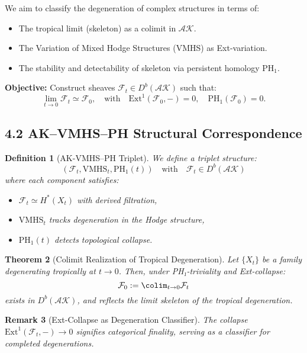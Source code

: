 \documentclass[11pt]{article}
\newtheorem{theorem}{Theorem}[section]
\newtheorem{definition}[theorem]{Definition}
\newtheorem{remark}[theorem]{Remark}
\begin{document}
We aim to classify the degeneration of complex structures in terms of:

\begin{itemize}
    \item The tropical limit (skeleton) as a colimit in \( \mathcal{AK} \).
    \item The Variation of Mixed Hodge Structures (VMHS) as Ext-variation.
    \item The stability and detectability of skeleton via persistent homology \( \mathrm{PH}_1 \).
\end{itemize}

\textbf{Objective:} Construct sheaves \( \mathcal{F}_t \in D^b(\mathcal{AK}) \) such that:
\[
\lim_{t \to 0} \mathcal{F}_t \simeq \mathcal{F}_0, \quad \text{with} \quad \mathrm{Ext}^1(\mathcal{F}_0, -) = 0, \quad \mathrm{PH}_1(\mathcal{F}_0) = 0.
\]

\subsection{4.2 AK--VMHS--PH Structural Correspondence}

\begin{definition}[AK-VMHS--PH Triplet]
We define a triplet structure:
\[
(\mathcal{F}_t, \mathrm{VMHS}_t, \mathrm{PH}_1(t)) \quad \text{with} \quad \mathcal{F}_t \in D^b(\mathcal{AK})
\]
where each component satisfies:
\begin{itemize}
    \item \( \mathcal{F}_t \simeq H^*(X_t) \) with derived filtration,
    \item \( \mathrm{VMHS}_t \) tracks degeneration in the Hodge structure,
    \item \( \mathrm{PH}_1(t) \) detects topological collapse.
\end{itemize}
\end{definition}

\begin{theorem}[Colimit Realization of Tropical Degeneration]
Let \( \{X_t\} \) be a family degenerating tropically at \( t \to 0 \). Then, under PH₁-triviality and Ext-collapse:
\[
\mathcal{F}_0 := \colim_{t \to 0} \mathcal{F}_t
\]
exists in \( D^b(\mathcal{AK}) \), and reflects the limit skeleton of the tropical degeneration.
\end{theorem}

\begin{remark}[Ext-Collapse as Degeneration Classifier]
The collapse \( \mathrm{Ext}^1(\mathcal{F}_t, -) \to 0 \) signifies categorical finality, serving as a classifier for completed degenerations.
\end{remark}
\end{document}

